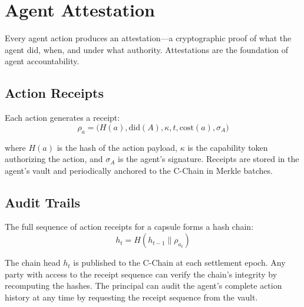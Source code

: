 

\section{Agent Attestation}
\label{sec:attestation}

Every agent action produces an attestation---a cryptographic proof of what the agent did, when, and under what authority. Attestations are the foundation of agent accountability.

\subsection{Action Receipts}

Each action generates a receipt:
\begin{equation}\label{eq:action-receipt}
    \rho_a = \big(H(a), \text{did}(A), \kappa, t, \text{cost}(a), \sigma_A\big)
\end{equation}

where $H(a)$ is the hash of the action payload, $\kappa$ is the capability token authorizing the action, and $\sigma_A$ is the agent's signature. Receipts are stored in the agent's vault and periodically anchored to the C-Chain in Merkle batches.

\subsection{Audit Trails}

The full sequence of action receipts for a capsule forms a hash chain:
\begin{equation}\label{eq:audit-chain}
    h_t = H(h_{t-1} \| \rho_{a_t})
\end{equation}

The chain head $h_t$ is published to the C-Chain at each settlement epoch. Any party with access to the receipt sequence can verify the chain's integrity by recomputing the hashes. The principal can audit the agent's complete action history at any time by requesting the receipt sequence from the vault.

